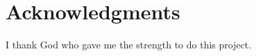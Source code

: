 \chapter*{Acknowledgments}\label{ch:acknowledgments}


I thank God who gave me the strength to do this project.